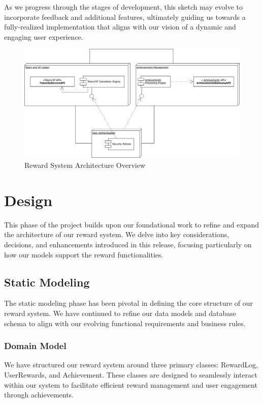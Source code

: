 As we progress through the stages of development, this sketch may evolve to incorporate feedback and additional features, ultimately guiding us towards a fully-realized implementation that aligns with our vision of a dynamic and engaging user experience.

 \begin{figure}[H]
    \centering
    \includegraphics[width=1\textwidth]{src/assets/chapters/reward-deployement-diagram.drawio.png}
    \caption{ Reward System Architecture Overview}
    \label{fig:reward_system_architecture_overview}
\end{figure}

\section{Design}
This phase of the project builds upon our foundational work to refine and expand the architecture of our reward system. We delve into key considerations, decisions, and enhancements introduced in this release, focusing particularly on how our models support the reward functionalities.

\subsection{Static Modeling}
The static modeling phase has been pivotal in defining the core structure of our reward system. We have continued to refine our data models and database schema to align with our evolving functional requirements and business rules.

\subsubsection{Domain Model}
We have structured our reward system around three primary classes: RewardLog, UserRewards, and Achievement. These classes are designed to seamlessly interact within our system to facilitate efficient reward management and user engagement through achievements.



